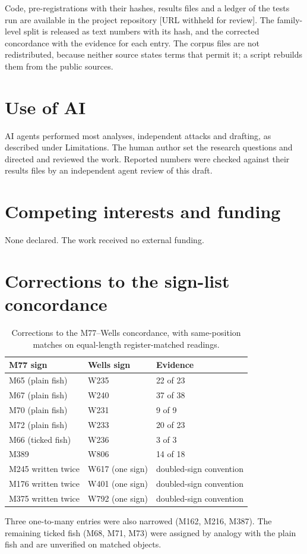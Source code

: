 \documentclass[11pt,a4paper]{article}
\newcommand{\sign}[1]{\textsf{#1}}
\begin{document}
Code, pre-registrations with their hashes, results files and a ledger of the tests run are available in the project repository [URL withheld for review]. The family-level split is released as text numbers with its hash, and the corrected concordance with the evidence for each entry. The corpus files are not redistributed, because neither source states terms that permit it; a script rebuilds them from the public sources.

\section*{Use of AI}

AI agents performed most analyses, independent attacks and drafting, as described under Limitations. The human author set the research questions and directed and reviewed the work. Reported numbers were checked against their results files by an independent agent review of this draft.

\section*{Competing interests and funding}

None declared. The work received no external funding.




\appendix
\section{Corrections to the sign-list concordance}
\label{app:concordance}

\begin{table}[h]
\centering
\caption{Corrections to the M77--Wells concordance, with same-position matches on equal-length register-matched readings.}
\begin{tabular}{lll}
\toprule
M77 sign & Wells sign & Evidence \\
\midrule
\sign{M65} (plain fish) & \sign{W235} & 22 of 23 \\
\sign{M67} (plain fish) & \sign{W240} & 37 of 38 \\
\sign{M70} (plain fish) & \sign{W231} & 9 of 9 \\
\sign{M72} (plain fish) & \sign{W233} & 20 of 23 \\
\sign{M66} (ticked fish) & \sign{W236} & 3 of 3 \\
\sign{M389} & \sign{W806} & 14 of 18 \\
\sign{M245} written twice & \sign{W617} (one sign) & doubled-sign convention \\
\sign{M176} written twice & \sign{W401} (one sign) & doubled-sign convention \\
\sign{M375} written twice & \sign{W792} (one sign) & doubled-sign convention \\
\bottomrule
\end{tabular}
\end{table}

Three one-to-many entries were also narrowed (\sign{M162}, \sign{M216}, \sign{M387}). The remaining ticked fish (\sign{M68}, \sign{M71}, \sign{M73}) were assigned by analogy with the plain fish and are unverified on matched objects.
\end{document}
